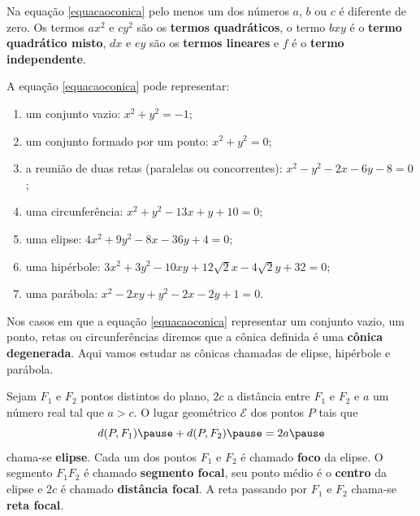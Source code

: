 \documentclass{beamer}
\begin{document}
\begin{frame}
    Na equação \eqref{equacaoconica} pelo menos um dos números $a$, $b$ ou $c$ \pause é diferente de zero. \pause Os termos $ax^2$ e $cy^2$ são os
    \textbf{termos quadráticos}, \pause o termo $bxy$ é o \textbf{termo quadrático misto}, \pause $dx$ e $ey$ são os \textbf{termos lineares} \pause e $f$ é o
    \textbf{termo independente}.
\end{frame}

\begin{frame}
    A equação \eqref{equacaoconica} pode representar:\pause
    \begin{enumerate}[label=({\roman*})]
        \item um conjunto vazio: $x^2 + y^2 = -1$;\pause
        \item um conjunto formado por um ponto: $x^2 + y^2 = 0$;\pause
        \item a reunião de duas retas (paralelas ou concorrentes): $x^2 - y^2 - 2x - 6y -8 =0$;\pause
        \item uma circunferência: $x^2 + y^2 - 13x + y + 10 = 0$;\pause
        \item uma elipse: $4x^2 + 9y^2 - 8x - 36y + 4 = 0$;\pause
        \item uma hipérbole: $3x^2 + 3y^2 - 10xy + 12\sqrt{2}x - 4\sqrt{2}y + 32 = 0$;\pause
        \item uma parábola: $x^2 - 2xy + y^2 -2x - 2y + 1 = 0$.
    \end{enumerate}
\end{frame}

\begin{frame}
    Nos casos em que a equação \eqref{equacaoconica} representar \pause um conjunto vazio, \pause um ponto, \pause retas ou circunferências \pause diremos
    que a cônica definida é uma \textbf{cônica degenerada}. \pause Aqui vamos estudar as cônicas chamadas de elipse, \pause hipérbole \pause e parábola.
\end{frame}

\begin{frame}
    \begin{definicao}
        Sejam $F_1$ e $F_2$ pontos distintos do plano, \pause $2c$ a distância entre $F_1$ e $F_2$ \pause e $a$ um número real \pause tal que $a > c$. \pause
        O lugar geométrico $\mathcal{E}$ \pause dos pontos $P$ tais que\pause
        \begin{equation}\label{definicaoelipse}
            d(P,F_1) \pause + d(P,F_2) \pause = 2a\pause
        \end{equation}
        chama-se \textbf{elipse}. \pause Cada um dos pontos $F_1$ e $F_2$ é chamado \textbf{foco} da elipse. \pause O segmento $F_1F_2$ é chamado
        \textbf{segmento focal}, \pause seu ponto médio é o \textbf{centro} da elipse \pause e $2c$ é chamado \textbf{distância focal}. \pause A reta
        passando por $F_1$ e $F_2$ chama-se \textbf{reta focal}.
    \end{definicao}
\end{frame}
\end{document}
